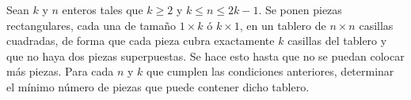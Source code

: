 Sean $k$ y $n$ enteros tales que $k \ge 2$ y $k \le n \le 2k − 1$. Se ponen piezas rectangulares,
cada una de tamaño $1 \times k$ ó $k \times 1$, en un tablero de $n \times n$ casillas cuadradas, de forma que cada
pieza cubra exactamente $k$ casillas del tablero y que no haya dos piezas superpuestas. Se hace esto
hasta que no se puedan colocar más piezas. Para cada $n$ y $k$ que cumplen las condiciones anteriores,
determinar el mínimo número de piezas que puede contener dicho tablero.